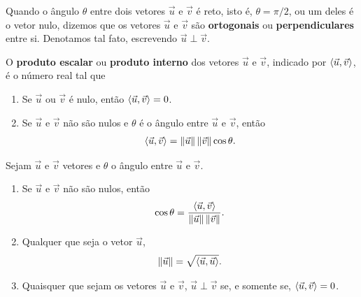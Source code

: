 \documentclass{beamer}
\begin{document}
\begin{frame}
    \begin{definicao}
        Quando o ângulo $\theta$ \pause entre dois vetores $\vec{u}$ e $\vec{v}$ \pause é reto, isto é, $\theta = \pi/2$, \pause ou um deles é o vetor nulo, \pause dizemos que os vetores $\vec{u}$ e $\vec{v}$ são \textbf{ortogonais} \pause ou \textbf{perpendiculares} entre si. \pause Denotamos tal fato, escrevendo $\vec{u} \perp \vec{v}$.
    \end{definicao}
\end{frame}

\begin{frame}
    \begin{definicao}\label{produtointerno-espaco}
        O \textbf{produto escalar} \pause ou \textbf{produto interno} \pause dos vetores $\vec{u}$ \pause e $\vec{v}$, \pause indicado por $\langle \vec{u}, \vec{v} \rangle$, \pause é o número real tal que\pause
        \begin{enumerate}[label=({\arabic*})]
            \item Se $\vec{u}$ \pause ou $\vec{v}$ é nulo, \pause então $\langle \vec{u}, \vec{v} \rangle = 0$.\pause
            \item Se $\vec{u}$ e $\vec{v}$ \pause não são nulos \pause e $\theta$ é o ângulo entre $\vec{u}$ e $\vec{v}$, \pause então
                  \begin{align}\label{produto-interno-espaco}
                      \langle \vec{u}, \vec{v} \rangle = \left\Vert{\vec{u}}\right\Vert\left\Vert{\vec{v}}\right\Vert\cos\theta.
                  \end{align}
        \end{enumerate}
    \end{definicao}
\end{frame}

\begin{frame}
    \begin{proposicao}
        Sejam $\vec{u}$ e $\vec{v}$ vetores \pause e $\theta$ o \pause ângulo entre $\vec{u}$ e $\vec{v}$.\pause
        \begin{enumerate}[label=({\arabic*})]
            \item Se $\vec{u}$ e $\vec{v}$ \pause não são nulos, \pause então\pause
                  \[
                      \cos\theta = \dfrac{\langle \vec{u}, \vec{v} \rangle}{\left\Vert{\vec{u}}\right\Vert\left\Vert{\vec{v}}\right\Vert}.
                  \]\pause
            \item Qualquer que seja o vetor $\vec{u}$,\pause
                  \[
                      \left\Vert{\vec{u}}\right\Vert = \sqrt{\langle \vec{u}, \vec{u} \rangle}.
                  \]\pause
            \item Quaisquer que sejam os vetores $\vec{u}$ \pause e $\vec{v}$, \pause $\vec{u}\perp\vec{v}$ \pause se, e somente se, \pause $\langle \vec{u}, \vec{v} \rangle = 0$.
        \end{enumerate}
    \end{proposicao}
\end{frame}
\end{document}
